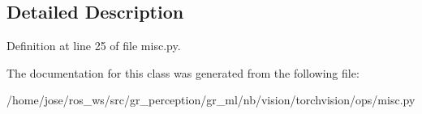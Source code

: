 \subsection{Detailed Description}


Definition at line 25 of file misc.\+py.



The documentation for this class was generated from the following file\+:\begin{DoxyCompactItemize}
\item 
/home/jose/ros\+\_\+ws/src/gr\+\_\+perception/gr\+\_\+ml/nb/vision/torchvision/ops/misc.\+py\end{DoxyCompactItemize}
